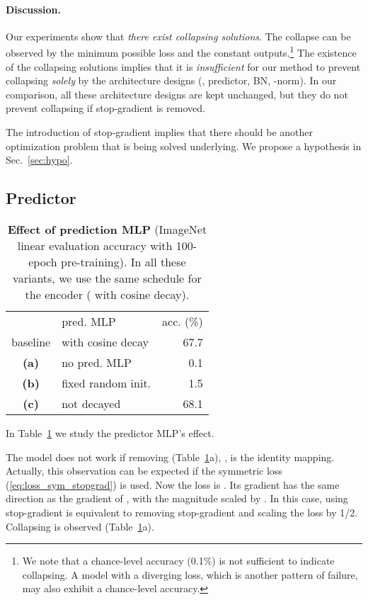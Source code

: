 \documentclass[final]{cvpr}
\newcommand{\tablestyle}[2]{\setlength{\tabcolsep}{#1}\renewcommand{\arraystretch}{#2}\centering\footnotesize}
\begin{document}
\paragraph{Discussion.}
Our experiments show that \emph{there exist collapsing solutions}. 
The collapse can be observed by the minimum possible loss and the constant outputs.\footnote{We note that a chance-level accuracy (0.1\%) is not sufficient to indicate collapsing. A model with a diverging loss, which is another pattern of failure, may also exhibit a chance-level accuracy. }
The existence of the collapsing solutions implies that it is \emph{insufficient} for our method to prevent collapsing \emph{solely} by the architecture designs (\eg, predictor, BN, -norm). In our comparison, all these architecture designs are kept unchanged, but they do not prevent collapsing if stop-gradient is removed.

The introduction of stop-gradient implies that there should be another optimization problem that is being solved underlying. We propose a hypothesis in Sec.~\ref{sec:hypo}.

\subsection{Predictor} \label{subsec:mlp2}

\begin{table}[t]
\centering
\small
\tablestyle{8pt}{1.1}
\begin{tabular}{cl|r}
& {pred. MLP }  & acc. (\%) \\
\shline
baseline &  with cosine decay & 67.7 \\
\textbf{(a)} & no pred. MLP & 0.1 \\
\textbf{(b)} & fixed random init. & 1.5 \\
\textbf{(c)} &  not decayed & 68.1  \\
\end{tabular}
\vspace{.5em}
\caption{\textbf{Effect of prediction MLP}  (ImageNet linear evaluation accuracy with 100-epoch pre-training). In all these variants, we use the same schedule for the encoder  (\mbox{} with cosine decay). 
\label{tab:mlp2}
}
\end{table}


In Table~\ref{tab:mlp2} we study the predictor MLP's effect. 

The model does not work if removing  (Table~\ref{tab:mlp2}a), \ie,  is the identity mapping.
Actually, this observation can be expected if the symmetric loss (\ref{eq:loss_sym_stopgrad}) is used. Now the loss is   . Its gradient has the same direction as the gradient of , with the magnitude scaled by . In this case, using stop-gradient is equivalent to removing stop-gradient and scaling the loss by 1/2. Collapsing is observed (Table~\ref{tab:mlp2}a).
\end{document}

